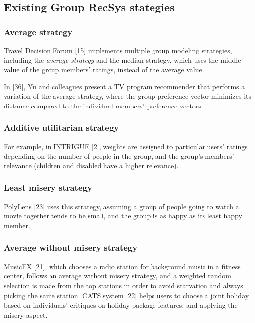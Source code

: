 \documentclass[]{article}
\begin{document}
\subsection{Existing Group RecSys stategies}

\subsubsection{Average strategy}

Travel Decision Forum {[}15{]} implements multiple group modeling
strategies, including the \emph{average strategy} and the median
strategy, which uses the middle value of the group members' ratings,
instead of the average value.

In {[}36{]}, Yu and colleagues present a TV program recommender that
performs a variation of the average strategy, where the group preference
vector minimizes its distance compared to the individual members'
preference vectors.

\subsubsection{Additive utilitarian strategy}

For example, in INTRIGUE {[}2{]}, weights are assigned to particular
users' ratings depending on the number of people in the group, and the
group's members' relevance (children and disabled have a higher
relevance).

\subsubsection{Least misery strategy}

PolyLens {[}23{]} uses this strategy, assuming a group of people going
to watch a movie together tends to be small, and the group is as happy
as its least happy member.

\subsubsection{Average without misery strategy}

MusicFX {[}21{]}, which chooses a radio station for background music in
a fitness center, follows an average without misery strategy, and a
weighted random selection is made from the top stations in order to
avoid starvation and always picking the same station. CATS system
{[}22{]} helps users to choose a joint holiday based on individuals'
critiques on holiday package features, and applying the misery aspect.
\end{document}
